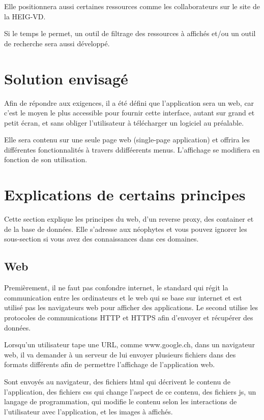 \documentclass[
    iai, %
    il, %
]{heig-tb}
\begin{document}
Elle positionnera aussi certaines ressources comme les collaborateurs sur le site de la HEIG-VD.

Si le temps le permet, un outil de filtrage des ressources à affichés et/ou un outil de recherche sera aussi développé.

\section{Solution envisagé}
Afin de répondre aux exigences, il a été défini que l'application sera un web,
car c'est le moyen le plus accessible pour fournir cette interface, autant sur grand et petit écran,
et sans obliger l'utilisateur à télécharger un logiciel au préalable.

Elle sera contenu sur une seule page web (single-page application)
et offrira les différentes fonctionnalités à travers ddifféerents menus.
L'affichage se modifiera en fonction de son utilisation.

\section{Explications de certains principes}
Cette section explique les principes du web, d'un reverse proxy, des container et de la base de données.
Elle s'adresse aux néophytes et vous pouvez ignorer les sous-section si vous avez des connaissances dans ces domaines.

\subsection{Web}
Premièrement, il ne faut pas confondre internet, le standard qui régit la communication entre les ordinateurs
et le web qui se base sur internet et est utilisé pas les navigateurs web pour afficher des applications.
Le second utilise les protocoles de communications HTTP et HTTPS afin d'envoyer et récupérer des données.

Lorsqu'un utilisateur tape une URL, comme www.google.ch, dans un navigateur web, il va demander à un serveur de lui envoyer
plusieurs fichiers dans des formats différents afin de permettre l'affichage de l'application web.

Sont envoyés au navigateur, des fichiers \gls{html} qui décrivent le contenu de l'application, des fichiers \gls{css} qui change l'aspect de ce contenu,
des fichiers \gls{js}, un langage de programmation, qui modifie le contenu selon les interactions de l'utilisateur avec l'application, et
les images à affichés.
\end{document}
